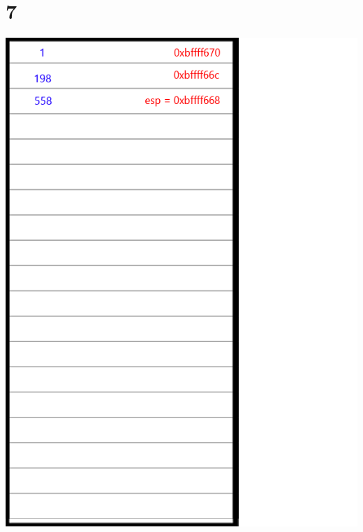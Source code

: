 \documentclass{article}
\begin{document}
\section*{7}
\begin{minipage}{5cm}
\includegraphics[scale=0.3]{s3.png}
\end{minipage}
\end{document}
